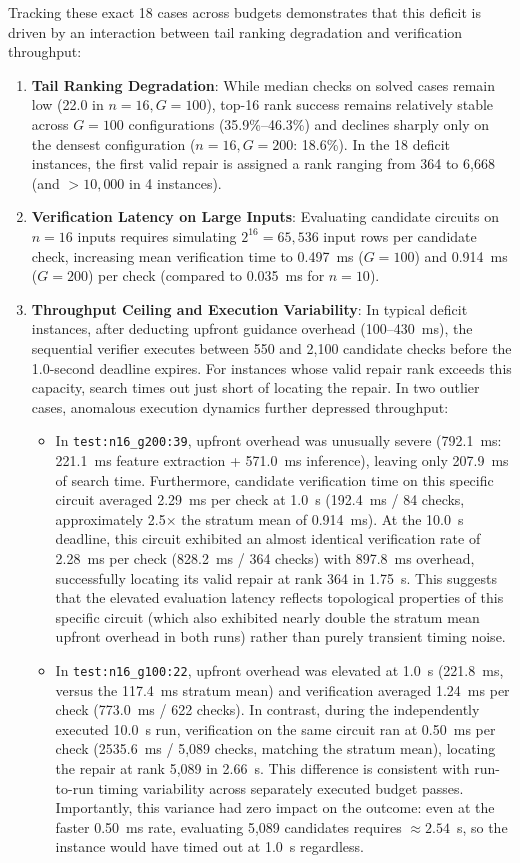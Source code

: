 \documentclass[11pt]{article}
\begin{document}
Tracking these exact 18 cases across budgets demonstrates that this deficit is driven by an interaction between tail ranking degradation and verification throughput:
\begin{enumerate}
    \item \textbf{Tail Ranking Degradation}: While median checks on solved cases remain low (22.0 in $n=16, G=100$), top-16 rank success remains relatively stable across $G=100$ configurations (35.9\%--46.3\%) and declines sharply only on the densest configuration ($n=16, G=200$: 18.6\%). In the 18 deficit instances, the first valid repair is assigned a rank ranging from 364 to 6,668 (and $>10,000$ in 4 instances).
    \item \textbf{Verification Latency on Large Inputs}: Evaluating candidate circuits on $n=16$ inputs requires simulating $2^{16} = 65,536$ input rows per candidate check, increasing mean verification time to 0.497~ms ($G=100$) and 0.914~ms ($G=200$) per check (compared to 0.035~ms for $n=10$).
    \item \textbf{Throughput Ceiling and Execution Variability}: In typical deficit instances, after deducting upfront guidance overhead (100--430~ms), the sequential verifier executes between 550 and 2,100 candidate checks before the 1.0-second deadline expires. For instances whose valid repair rank exceeds this capacity, search times out just short of locating the repair. In two outlier cases, anomalous execution dynamics further depressed throughput:
    \begin{itemize}
        \item In \texttt{test:n16\_g200:39}, upfront overhead was unusually severe (792.1~ms: 221.1~ms feature extraction + 571.0~ms inference), leaving only 207.9~ms of search time. Furthermore, candidate verification time on this specific circuit averaged 2.29~ms per check at 1.0~s (192.4~ms / 84 checks, approximately 2.5$\times$ the stratum mean of 0.914~ms). At the 10.0~s deadline, this circuit exhibited an almost identical verification rate of 2.28~ms per check (828.2~ms / 364 checks) with 897.8~ms overhead, successfully locating its valid repair at rank 364 in 1.75~s. This suggests that the elevated evaluation latency reflects topological properties of this specific circuit (which also exhibited nearly double the stratum mean upfront overhead in both runs) rather than purely transient timing noise.
        \item In \texttt{test:n16\_g100:22}, upfront overhead was elevated at 1.0~s (221.8~ms, versus the 117.4~ms stratum mean) and verification averaged 1.24~ms per check (773.0~ms / 622 checks). In contrast, during the independently executed 10.0~s run, verification on the same circuit ran at 0.50~ms per check (2535.6~ms / 5,089 checks, matching the stratum mean), locating the repair at rank 5,089 in 2.66~s. This difference is consistent with run-to-run timing variability across separately executed budget passes. Importantly, this variance had zero impact on the outcome: even at the faster 0.50~ms rate, evaluating 5,089 candidates requires $\approx 2.54$~s, so the instance would have timed out at 1.0~s regardless.

\end{itemize}
\end{enumerate}
\end{document}
